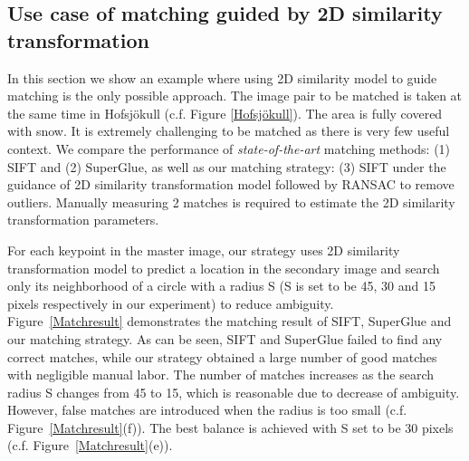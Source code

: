 \subsection{Use case of matching guided by 2D similarity transformation}
\label{inputHomography}
In this section we show an example where using 2D similarity model to guide matching is the only possible approach. 
The image pair to be matched is taken at the same time in Hofsjökull (c.f. Figure \ref{Hofsjökull}). The area is fully covered with snow. It is extremely challenging to be matched as there is very few useful context.
We compare the performance of \textit{state-of-the-art} matching methods: (1) SIFT and (2) SuperGlue, as well as our matching strategy: (3) SIFT under the guidance of 2D similarity transformation model followed by RANSAC to remove outliers. Manually measuring 2 matches is required to estimate the 2D similarity transformation parameters.
\par
For each keypoint in the master image, our strategy uses 2D similarity transformation model to predict a location in the secondary image and search only its neighborhood of a circle with a radius S (S is set to be 45, 30 and 15 pixels respectively in our experiment) to reduce ambiguity.\\
Figure~\ref{Matchresult} demonstrates the matching result of SIFT, SuperGlue and our matching strategy. As can be seen, SIFT and SuperGlue failed to find any correct matches, while our strategy obtained a large number of good matches with negligible manual labor. The number of matches increases as the search radius S changes from 45 to 15, which is reasonable due to decrease of ambiguity. However, false matches are introduced when the radius is too small (c.f. Figure~\ref{Matchresult}(f)). The best balance is achieved with S set to be 30 pixels (c.f. Figure~\ref{Matchresult}(e)).\\
